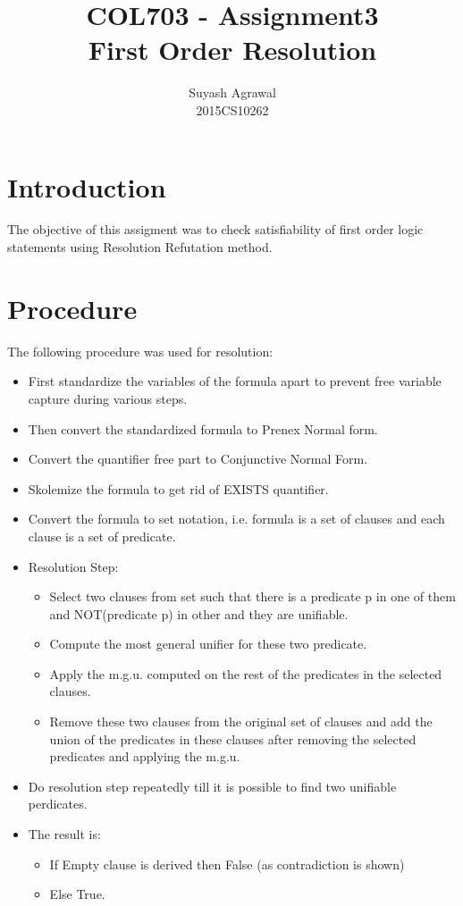 \documentclass{article}
\title{COL703 - Assignment3\\First Order Resolution}
\author{Suyash Agrawal\\2015CS10262}
\begin{document}
\maketitle

\section*{Introduction}
The objective of this assigment was to check satisfiability of first order logic statements
using Resolution Refutation method.

\section*{Procedure}
The following procedure was used for resolution:
\begin{itemize}
    \item First standardize the variables of the formula apart to prevent free variable capture during various steps.
    \item Then convert the standardized formula to Prenex Normal form.
    \item Convert the quantifier free part to Conjunctive Normal Form.
    \item Skolemize the formula to get rid of EXISTS quantifier.
    \item Convert the formula to set notation, i.e. formula is a set of clauses and each clause is a set of predicate.
    \item Resolution Step:
    \begin{itemize}
        \item Select two clauses from set such that there is a predicate p in one of them and NOT(predicate p) in other
              and they are unifiable.
        \item Compute the most general unifier for these two predicate.
        \item Apply the m.g.u. computed on the rest of the predicates in the selected clauses.
        \item Remove these two clauses from the original set of clauses and add the union of the predicates in these 
              clauses after removing the selected predicates and applying the m.g.u.
    \end{itemize}
    \item Do resolution step repeatedly till it is possible to find two unifiable perdicates.
    \item The result is:
    \begin{itemize}
        \item If Empty clause is derived then False (as contradiction is shown)
        \item Else True.
    \end{itemize}
\end{itemize}
\end{document}
